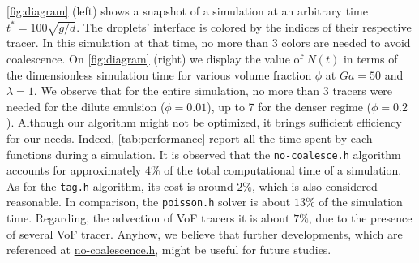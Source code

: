 \ref{fig:diagram} (left) shows a snapshot of a simulation at an arbitrary time $t^* = 100 \sqrt{g/d}$. 
The droplets' interface is colored by the indices of their respective tracer. 
In this simulation at that time, no more than 3 colors are needed to avoid coalescence.
On \ref{fig:diagram} (right) we display the value of $N(t)$ in terms of the dimensionless simulation time for various volume fraction $\phi$ at $Ga = 50$ and  $\lambda = 1$. 
We observe that for the entire simulation, no more than 3 tracers were needed for the dilute emulsion ($\phi = 0.01$), up to 7 for the denser regime ($\phi = 0.2$). 
Although our algorithm might not be optimized, it brings sufficient efficiency for our needs. 
Indeed, \ref{tab:performance} report all the time spent by each functions during a simulation. 
It is observed that the \texttt{no-coalesce.h} algorithm accounts for approximately $4\%$ of the total computational time of a simulation. 
As for the \texttt{tag.h} algorithm, its cost is around $2\%$, which is also considered reasonable.
In comparison, the \texttt{poisson.h} solver is about $13\%$ of the simulation time. 
Regarding, the advection of VoF tracers it is about $7\%$, due to the presence of several VoF tracer. 
Anyhow, we believe that further developments, which are referenced at \href{http://basilisk.fr/sandbox/fintzin/Rising-Suspenion/no-coalescence.h}{no-coalescence.h}, might be useful for future studies.
